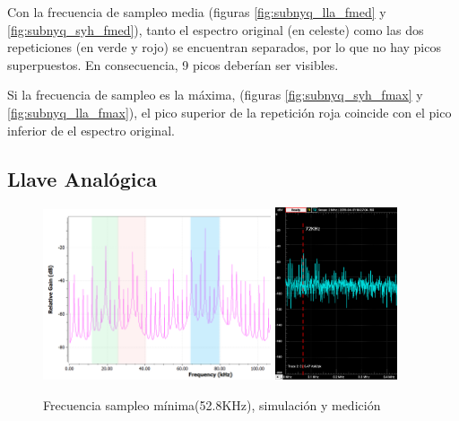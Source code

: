 \documentclass[../../ASSD_TP1_G7.tex]{subfiles}
\begin{document}
Con la frecuencia de sampleo media (figuras \ref{fig:subnyq_lla_fmed} y \ref{fig:subnyq_syh_fmed}), tanto el espectro original (en celeste) como las dos repeticiones (en verde y rojo) se encuentran separados, por lo que no hay picos superpuestos. En consecuencia, 9 picos deber\'ian ser visibles. 

Si la frecuencia de sampleo es la m\'axima, (figuras \ref{fig:subnyq_syh_fmax} y \ref{fig:subnyq_lla_fmax}), el pico superior de la repetici\'on roja coincide con el pico inferior de el espectro original.



\subsection*{Llave Analógica}
\begin{figure}[H]
\centering
{}
{\includegraphics[width=0.6\textwidth]{figures/simpto_8_llave_52,8khz_espectro.png}}
{\includegraphics[width=0.32\textwidth]{figures/pto_8_llave_52,8khz_espectro.png}}
\caption{Frecuencia sampleo mínima(52.8KHz), simulación y medición}
\label{fig:subnyq_lla_fmin}
\end{figure}
\end{document}
